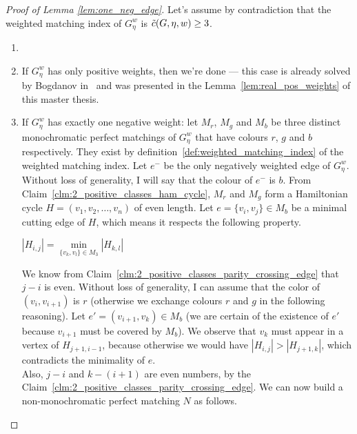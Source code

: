 \begin{proof}[Proof of Lemma \ref{lem:one_neg_edge}]

    Let's assume by contradiction that the weighted matching index of $G_\eta^w$ is $\Tilde{c}(G, \eta, w) \geq 3$.

    \begin{enumerate}
        \item[]

        \item If $G_\eta^w$ has only positive weights, then we're done — this case is already solved by Bogdanov in~\cite{bogdanov} and was presented in the Lemma~\ref{lem:real_pos_weights} of this master thesis.

        \item If $G_\eta^w$ has exactly one negative weight: let $M_r$, $M_g$ and $M_b$ be three distinct monochromatic perfect matchings of $G_\eta^w$ that have colours $r$, $g$ and $b$ respectively.
        They exist by definition~\ref{def:weighted_matching_index} of the weighted matching index.
        Let $e^-$ be the only negatively weighted edge of $G_\eta^w$.
        Without loss of generality, I will say that the colour of $e^-$ is $b$.
        From Claim~\ref{clm:2_positive_classes_ham_cycle}, $M_r$ and $M_g$ form a Hamiltonian cycle $H = (v_1, v_2, \dots, v_n)$ of even length.
        Let $e = \{v_i, v_j\} \in M_b$ be a minimal cutting edge of $H$, which means it respects the following property.
        \begin{center}
            $\left| H_{i, j} \right| = \min\limits_{\{v_k, v_l\} \in M_3} \left| H_{k, l} \right|$
        \end{center}

        We know from Claim~\ref{clm:2_positive_classes_parity_crossing_edge} that $j-i$ is even.
        Without loss of generality, I can assume that the color of $(v_i, v_{i + 1})$ is $r$ (otherwise we exchange colours $r$ and $g$ in the following reasoning).
        Let $e' = (v_{i + 1}, v_k) \in M_b$ (we are certain of the existence of $e'$ because $v_{i+1}$ must be covered by $M_b$).
        We observe that $v_k$ must appear in a vertex of $H_{j+1, i-1}$, because otherwise we would have $\left| H_{i, j} \right| > \left| H_{j+1, k} \right|$, which contradicts the minimality of $e$.\\

        Also, $j - i$ and $k - (i + 1)$ are even numbers, by the Claim~\ref{clm:2_positive_classes_parity_crossing_edge}.
        We can now build a non-monochromatic perfect matching $N$ as follows.


\end{enumerate}
\end{proof}
